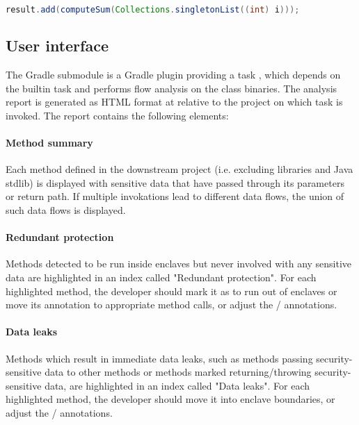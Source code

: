 \begin{lstlisting}[style=j, language=java, label={lst:computeSum},
caption={Example of leak through computeSum}]
	result.add(computeSum(Collections.singletonList((int) i)));
\end{lstlisting}

\subsection{User interface}
The  Gradle submodule
is a Gradle plugin providing a task ,
which depends on the  builtin task
and performs flow analysis on the class binaries.
The analysis report is generated as HTML format at
relative to the project on which task is invoked.
The report contains the following elements:

\paragraph{Method summary}
Each method defined in the downstream project (i.e. excluding libraries and Java stdlib)
is displayed with sensitive data that have passed through its parameters or return path.
If multiple invokations lead to different data flows,
the union of such data flows is displayed.

\paragraph{Redundant protection}
Methods detected to be run inside enclaves but never involved with any sensitive data
are highlighted in an index called "Redundant protection".
For each highlighted method, the developer
should mark it as  to run out of enclaves
or move its  annotation to appropriate method calls,
or adjust the / annotations.

\paragraph{Data leaks}
Methods which result in immediate data leaks,
such as methods passing security-sensitive data to other  methods
or methods marked  returning/throwing security-sensitive data,
are highlighted in an index called "Data leaks".
For each highlighted method, the developer
should move it into enclave boundaries,
or adjust the / annotations.

